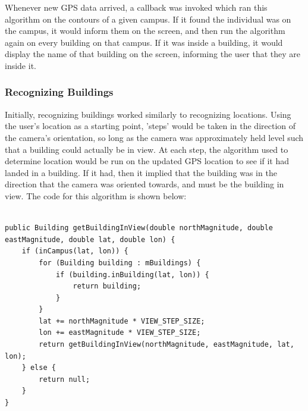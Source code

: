 \documentclass[12pt,journal,compsoc]{IEEEtran}
\begin{document}
Whenever new GPS data arrived, a callback was invoked which ran this algorithm on the contours of a given campus. If it found the individual was on the campus, it would inform them on the screen, and then run the algorithm again on every building on that campus. If it was inside a building, it would display the name of that building on the screen, informing the user that they are inside it.

\subsubsection{Recognizing Buildings} 

Initially, recognizing buildings worked similarly to recognizing locations. Using the user's location as a starting point, 'steps' would be taken in the direction of the camera's orientation, so long as the camera was approximately held level such that a building could actually be in view. At each step, the algorithm used to determine location would be run on the updated GPS location to see if it had landed in a building. If it had, then it implied that the building was in the direction that the camera was oriented towards, and must be the building in view. The code for this algorithm is shown below:

\pagebreak

\begin{lstlisting}

public Building getBuildingInView(double northMagnitude, double 	eastMagnitude, double lat, double lon) {
    if (inCampus(lat, lon)) {
        for (Building building : mBuildings) {
            if (building.inBuilding(lat, lon)) {
                return building;
            }
        }
        lat += northMagnitude * VIEW_STEP_SIZE;
        lon += eastMagnitude * VIEW_STEP_SIZE;
        return getBuildingInView(northMagnitude, eastMagnitude, lat, lon);
    } else {
        return null;
    }
}
\end{lstlisting}
\end{document}
